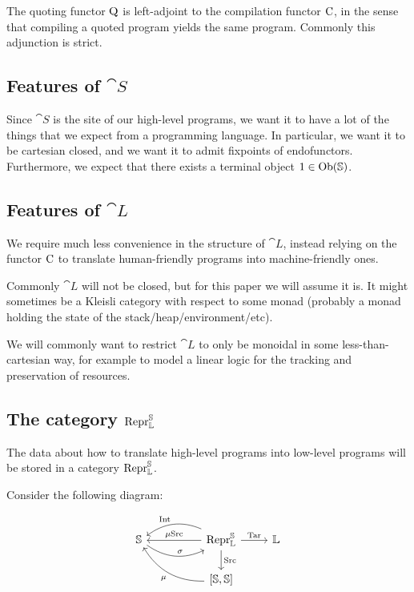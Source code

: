 The quoting functor $\mathrm Q$ is left-adjoint to the compilation functor $\mathrm
  C$, in the sense that compiling a quoted program yields the same program.
Commonly this adjunction is strict.

\subsection{Features of $\cat S$}

Since $\cat S$ is the site of our high-level programs, we want it to have a lot
of the things that we expect from a programming language. In particular, we
want it to be cartesian closed, and we want it to admit fixpoints of
endofunctors. Furthermore, we expect that there exists a terminal object $1 \in
  \mathrm{Ob}(\mathbb S)$.

\subsection{Features of $\cat L$}

We require much less convenience in the structure of $\cat L$, instead relying
on the functor $\mathrm C$ to translate human-friendly programs into
machine-friendly ones.

Commonly $\cat L$ will not be closed, but for this paper we will assume it is.
It might sometimes be a Kleisli category with respect to some monad (probably a
monad holding the state of the stack/heap/environment/etc).

We will commonly want to restrict $\cat L$ to only be monoidal in some
less-than-cartesian way, for example to model a linear logic for the tracking
and preservation of resources.

\subsection{The category $\mathrm{Repr} _{\mathbb L} ^{\mathbb S}$}

The data about how to translate high-level programs into low-level programs
will be stored in a category $\mathrm{Repr} _{\mathbb L} ^{\mathbb S}$.

Consider the following diagram:

\begin{equation}
  \begin{tikzcd}
    \cat S \arrow[r, bend right, "\sigma"]
    & [25pt] \Repr _{\cat L} ^{\cat S} \arrow[l, bend right, swap, "\fun {Int}"] \arrow[l, swap, "\mu \fun {Src}"] \arrow[r, "\fun {Tar}"] \arrow[d, "\fun {Src}"]
    & \cat L \\
    & {[\cat S, \cat S]} \arrow[ul, bend left, "\mu"] &
  \end{tikzcd}
\end{equation}

